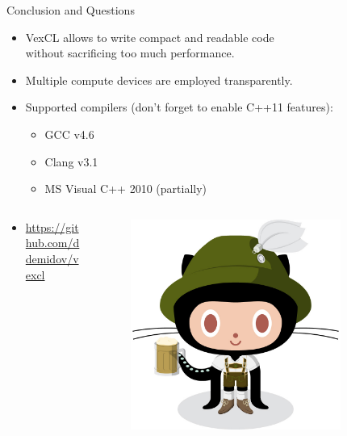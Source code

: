 \documentclass[@BEAMER_OPTIONS@]{beamer}
\begin{document}
\begin{frame}{Conclusion and Questions}
    \begin{itemize}
        \item VexCL allows to write compact and readable code\\
            without sacrificing too much performance.
        \item Multiple compute devices are employed transparently.
        \item Supported compilers (don't forget to enable C++11 features):
            \begin{itemize}
                \item GCC v4.6
                \item Clang v3.1
                \item MS Visual C++ 2010 (partially)
            \end{itemize}
    \end{itemize}

    \begin{columns}
        \begin{column}{0.5\textwidth}
            \begin{itemize}
                \item \href{https://github.com/ddemidov/vexcl}
                    {https://github.com/ddemidov/vexcl}
            \end{itemize}
        \end{column}
        \begin{column}{0.25\textwidth}
            \begin{figure}
                \includegraphics[width=0.9\textwidth]{oktobercat}
            \end{figure}
        \end{column}
        \begin{column}{0.1\textwidth}
        \end{column}
    \end{columns}
\end{frame}
\end{document}

